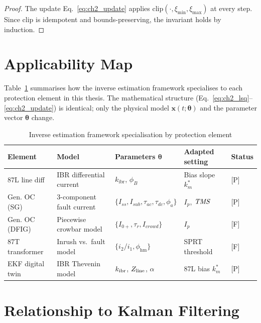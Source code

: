 \begin{proof}
The update Eq.~\eqref{eq:ch2_update} applies $\mathrm{clip}(\cdot,
\xi_\mathrm{min}, \xi_\mathrm{max})$ at every step. Since $\mathrm{clip}$
is idempotent and bounds-preserving, the invariant holds by induction.
\end{proof}

\section{Applicability Map}
\label{sec:ch2_map}

Table~\ref{tab:ch2_applicability} summarises how the inverse estimation
framework specialises to each protection element in this thesis.
The mathematical structure (Eq.~\eqref{eq:ch2_lsq}--\eqref{eq:ch2_update})
is identical; only the physical model $\mathbf{x}(t;\bm{\theta})$ and
the parameter vector $\bm{\theta}$ change.

\begin{table}[htbp]
\caption{Inverse estimation framework specialisation by protection element}
\label{tab:ch2_applicability}
\small
\begin{tabularx}{\textwidth}{@{}lp{2.5cm}p{3.5cm}p{2.5cm}p{2cm}@{}}
\toprule
Element & Model & Parameters $\bm{\theta}$ & Adapted setting & Status \\
\midrule
87L line diff & IBR differential current & $k_\mathrm{ibr}$, $\phi_B$ & Bias slope $k_m^*$ & [P] \\
Gen. OC (SG) & 3-component fault current & $\{I_{ss},I_{sub},\tau_{ac},\tau_{dc},\phi_a\}$ & $I_p$, $\mathit{TMS}$ & [P] \\
Gen. OC (DFIG) & Piecewise crowbar model & $\{I_{0+},\tau_r,I_{crowd}\}$ & $I_p$ & [F] \\
87T transformer & Inrush vs.\ fault model & $\{i_2/i_1,\phi_\mathrm{hm}\}$ & SPRT threshold & [F] \\
EKF digital twin & IBR Thevenin model & $k_\mathrm{ibr}$, $Z_\mathrm{line}$, $\alpha$ & 87L bias $k_m^*$ & [P] \\
\bottomrule
\end{tabularx}
\end{table}

\section{Relationship to Kalman Filtering}
\label{sec:ch2_ekf_relation}

